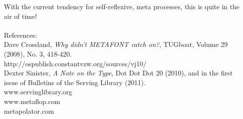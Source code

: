 \documentclass[danish,a2paper,11pt]{scrartcl}
\begin{document}
\begin{multicols*}{3}
With the current tendency for self-reflexive, meta processes, this is quite in the air of time!\\ 
\\
References:\\
Dave Crossland, {\it Why didn't METAFONT catch on?}, TUGboat, Volume 29 (2008), No. 3, 418-420.\\
http://ospublish.constantvzw.org/\linebreak sources/vj10/\\
Dexter Sinister, {\it A Note on the Type}, Dot Dot Dot 20 (2010), and in the first issue of Bulletins of the Serving Library (2011).\\
www.servinglibrary.org\\
www.metaflop.com\\
metapolator.com

\end{multicols*}
\end{document}

